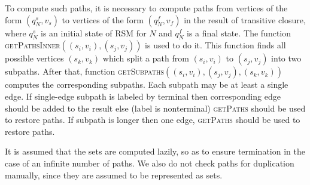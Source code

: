 To compute such paths, it is necessary to compute paths from vertices of the form $(q_N^s,v_s)$ to vertices of the form $(q_N^f, v_f)$ in the result of transitive closure, where $q_N^s$ is an initial state of RSM for $N$ and $q_N^f$ is a final state.
The function \textsc{getPathsInner}$((s_i,v_i),(s_j,v_j))$ is used to do it.
This function finds all possible vertices $(s_k,v_k)$  which split a path from $(s_i,v_i)$ to $(s_j,v_j)$ into two subpaths.
After that, function \textsc{getSubpaths}$((s_i,v_i),(s_j,v_j),(s_k,v_k))$ computes the corresponding subpaths.
Each subpath may be at least a single edge.
If single-edge subpath is labeled by terminal then corresponding edge should be added to the result else (label is nonterminal) \textsc{getPaths} should be used to restore paths.
If subpath is longer then one edge, \textsc{getPaths} should be used to restore paths. 

It is assumed that the sets are computed lazily, so as to ensure termination in the case of an infinite number of paths.
We also do not check paths for duplication manually, since they are assumed to be represented as sets.